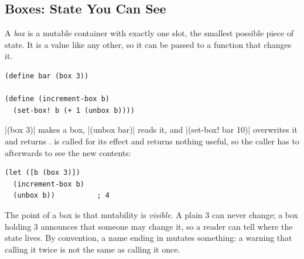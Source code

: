 \subsection{Boxes: State You Can See}

A \emph{box} is a mutable container with exactly one slot, the smallest possible piece of state. It is a value like any other, so it can be passed to a function that changes it.
\begin{lstlisting}
(define bar (box 3))

(define (increment-box b)
  (set-box! b (+ 1 (unbox b))))
\end{lstlisting}
\rkt|(box 3)| makes a box, \rkt|(unbox bar)| reads it, and \rkt|(set-box! bar 10)| overwrites it and returns .  is called for its effect and returns nothing useful, so the caller has to  afterwards to see the new contents:
\begin{lstlisting}
(let ([b (box 3)])
  (increment-box b)
  (unbox b))          ; 4
\end{lstlisting}

The point of a box is that mutability is \emph{visible}. A plain 3 can never change; a box holding 3 announces that someone may change it, so a reader can tell where the state lives. By convention, a name ending in \code{!} mutates something: a warning that calling it twice is not the same as calling it once.
